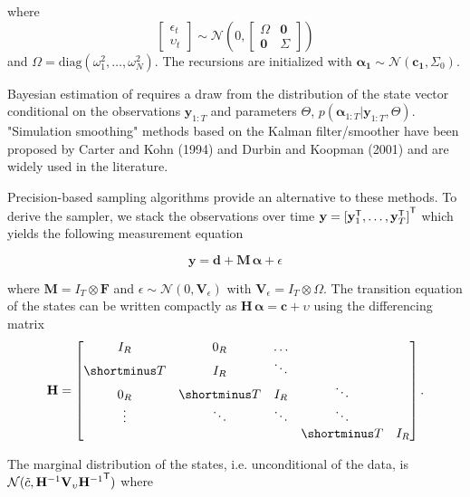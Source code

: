 \documentclass[notitlepage,a4paper,12pt]{article}
\newcommand{\transpose}[1]{{#1}^{\sf{T}}}
\begin{document}
where 
$$
\begin{bmatrix}
    \epsilon_t \\
    \upsilon_t
\end{bmatrix}
\sim \mathcal{N}(0,
\begin{bmatrix}
\Omega & \mathbf{0} \\
\mathbf{0} & \Sigma
\end{bmatrix}
)
$$
and $\Omega = \text{diag}(\omega^2_{1}, \dots, \omega^2_{N})$. The recursions are initialized with $\boldsymbol{\alpha_1} \sim \mathcal{N}(\mathbf{c_1}, \Sigma_0)$.

Bayesian estimation of  requires a draw from the distribution of the state vector conditional on the observations $\mathbf{y}_{1:T}$ and parameters $\Theta$, $p(\mathbf{\alpha}_{1:T}|\mathbf{y}_{1:T}, \Theta)$. "Simulation smoothing" methods based on the Kalman filter/smoother have been proposed by Carter and Kohn (1994) and Durbin and Koopman (2001) and are widely used in the literature.

Precision-based sampling algorithms \citep{chanjeliazkov_2009} provide an alternative to these methods. To derive the sampler, we stack the observations over time $\mathbf{y} = \transpose{[\transpose{\mathbf{y}}_1, \dots, \transpose{\mathbf{y}}_T]}$ which yields the following measurement equation

\begin{equation}
\mathbf{y} = \mathbf{d} + \mathbf{M} \, \boldsymbol{\alpha} + \epsilon
\end{equation} 

where $ \mathbf{M} = I_T \otimes \mathbf{F}$ and $\epsilon \sim \mathcal{N}(0, \mathbf{V}_{\epsilon})$ with $\mathbf{V}_{\epsilon} = I_T \otimes \Omega$. The transition equation of the states can be written compactly as $\mathbf{H}\, \boldsymbol{\alpha} = \mathbf{c} + \upsilon$ using the differencing matrix 
$$
\mathbf{H}
=
\begin{bmatrix}
    I_R & 0_R & \dots \\
    \shortminus T & I_R & \ddots \\
    0_R & \shortminus T & I_R & \ddots \\
    \vdots & \ddots & \ddots & \ddots \\
    & & & \shortminus T & I_R
\end{bmatrix}.
$$

The marginal distribution of the states, i.e. unconditional of the data, is $\mathcal{N}(\tilde{c},\mathbf{H}^{-1} \mathbf{V}_{\upsilon} \transpose{\mathbf{H}^{-1}})$ where 
\end{document}
